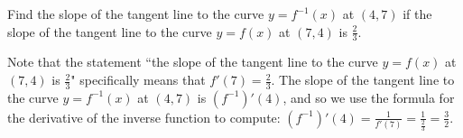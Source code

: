 \documentclass[nooutcomes]{ximera}
\begin{document}
\begin{problem}
  Find the slope of the tangent line to the curve $y = f^{-1}(x)$ at $(4,7)$ if the slope of the tangent line to the curve $y=f(x)$ at $(7,4)$ is $\frac{2}{3}$.
  \begin{freeResponse}
    Note that the statement ``the slope of the tangent line to the curve $y=f(x)$ at $(7,4)$ is $\frac{2}{3}$" specifically means that $f'(7) = \frac{2}{3}$.
    The slope of the tangent line to the curve $y = f^{-1}(x)$ at $(4,7)$ is $(f^{-1})'(4)$, and so we use the formula for the derivative of the inverse function to compute: $(f^{-1})'(4) = \frac{1}{f'(7)} = \frac{1}{\frac{2}{3}} = \frac{3}{2}$.
  \end{freeResponse}
\end{problem}
\end{document}
